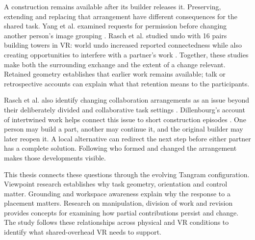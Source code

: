 A construction remains available after its builder releases it. Preserving, extending and replacing that arrangement have different consequences for the shared task. Yang et al. examined requests for permission before changing another person's image grouping \cite{yang2022}. Rasch et al. studied undo with 16 pairs building towers in VR: world undo increased reported connectedness while also creating opportunities to interfere with a partner's work \cite{rasch2024}. Together, these studies make both the surrounding exchange and the extent of a change relevant. Retained geometry establishes that earlier work remains available; talk or retrospective accounts can explain what that retention means to the participants.

Rasch et al. also identify changing collaboration arrangements as an issue beyond their deliberately divided and collaborative task settings \cite{rasch2024}. Dillenbourg's account of intertwined work helps connect this issue to short construction episodes \cite{dillenbourg1999}. One person may build a part, another may continue it, and the original builder may later reopen it. A local alternative can redirect the next step before either partner has a complete solution. Following who formed and changed the arrangement makes those developments visible.

This thesis connects these questions through the evolving Tangram configuration. Viewpoint research establishes why task geometry, orientation and control matter. Grounding and workspace awareness explain why the response to a placement matters. Research on manipulation, division of work and revision provides concepts for examining how partial contributions persist and change. The study follows these relationships across physical and VR conditions to identify what shared-overhead VR needs to support.
